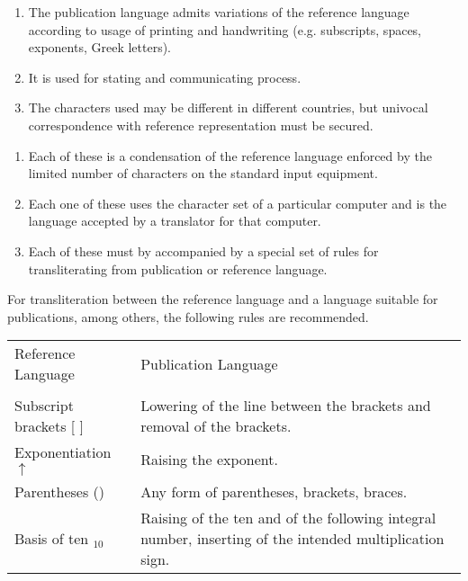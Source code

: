 \documentclass[a4paper,11pt]{article}
\begin{document}

\begin{enumerate}
\item The publication language admits variations of the reference
      language according to usage of printing and handwriting (e.g.
      subscripts, spaces, exponents, Greek letters).

\item It is used for stating and communicating process.

\item The characters used may be different in different countries, but
      univocal correspondence with reference representation must be
      secured.
\end{enumerate}



\begin{enumerate}
\item Each of these is a condensation of the reference language enforced
      by the limited number of characters on the standard input
      equipment.

\item Each one of these uses the character set of a particular computer
      and is the language accepted by a translator for that computer.

\item Each of these must by accompanied by a special set of rules for
      transliterating from publication or reference language.
\end{enumerate}

For transliteration between the reference language and a language
suitable for publications, among others, the following rules are
recommended.


\begin{tabular*}{15.0cm}{lp{10.0cm}}
\\
Reference Language            & Publication Language \\ \\


Subscript brackets [ ]        & Lowering of the line between the
                                brackets and removal of the brackets. \\

Exponentiation $\uparrow$     & Raising the exponent. \\

Parentheses ()                & Any form of parentheses, brackets,
                                braces. \\

Basis of ten $_{10}$           &      Raising of the ten and of the following
                                integral number, inserting of the
                                intended multiplication sign. \\
\end{tabular*}
\end{document}
